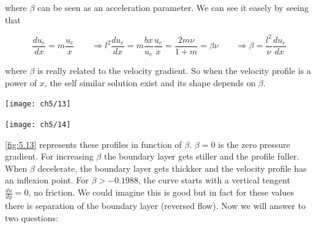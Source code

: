 			where $\beta$ can be seen as an acceleration parameter. We can see it easely by seeing that 
			
			\begin{equation}
				\frac{du_e}{dx} = m\frac{u_e}{x} \qquad \Rightarrow l^2 \frac{du_e}{dx} = m \frac{bx}{u_e}\frac{u_e}{x} = \frac{2 m\nu}{1+m} = \beta \nu \qquad \Rightarrow \beta = \frac{l^2}{\nu} \frac{du_e}{dx}
			\end{equation}
			
			where $\beta$ is really related to the velocity gradient. So when the velocity profile is a power of $x$, the self similar solution exist and its shape depends on $\beta$. 
			
\begin{center}
	\begin{minipage}{0.49\textwidth}
\begin{center}
	\texttt{[image: ch5/13]}
\end{center}
	\label{fig:5.13}
	\end{minipage}
	\begin{minipage}{0.49\textwidth}
\begin{center}
	\texttt{[image: ch5/14]}	
\end{center}
	\label{fig:5.14}
	\end{minipage}
	\end{center}
	
			\autoref{fig:5.13} represents these profiles in function of $\beta$. $\beta = 0$ is the zero pressure gradient. For increasing $\beta$ the boundary layer gets stiller and the profile fuller. When $\beta$ decelerate, the boundary layer gets thickker and the velocity profile has an inflexion point. For $\beta > -0.1988$, the curve starts with a vertical tengent $\frac{du}{dy} = 0$, no friction. We could imagine this is good but in fact for these values there is separation of the boundary layer (reversed flow). Now we will answer to two questions:\\
			
